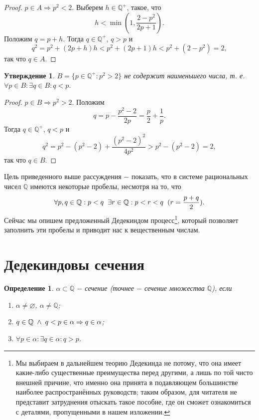 \documentclass{article}
\newtheorem{claim}{Утверждение}[section]
\newtheorem{definition}{Определение}[section]
\begin{document}
\begin{proof}
\(p \in A \Rightarrow p^2 < 2\). Выберем \(h \in \mathbb{Q^{+}}\), такое, что
\[
h < \min(1, \frac{2-p^2}{2p+1}).
\]
Положим \(q = p + h\). Тогда \(q \in \mathbb{Q^{+}}\), \(q > p\) и
\[
q^2 = p^2 + (2p + h)h < p^2 + (2p + 1)h < p^2 + (2 - p^2) = 2,
\]
так что \(q \in A\).
\end{proof}

\begin{claim}
\(B=\{p \in \mathbb{Q^{+}} : p^2 > 2\}\) не содержит наименьшего числа, т. е. \(\forall p \in B : \exists q \in B : q < p\).
\end{claim}

\begin{proof}
\(p \in B \Rightarrow p^2 > 2\). Положим
\[
q=p - \frac{p^2 - 2}{2p} = \frac{p}{2} + \frac{1}{p}.
\]
Тогда \(q \in \mathbb{Q^{+}}\), \(q < p\) и
\[
q^2 = p^2 - (p^2 - 2) + \frac{(p^2 - 2)^2}{4p^2} > p^2 - (p^2 - 2) = 2,
\]
так что \(q \in B\).
\end{proof}

Цель приведенного выше рассуждения \(-\) показать, что в системе рациональных чисел \(\mathbb{Q}\) имеются некоторые пробелы, несмотря на то, что 
\[
\forall p, q \in \mathbb{Q} : p < q \hspace{2mm} \exists r \in \mathbb{Q} : p < r < q \hspace{2mm} (r=\frac{p+q}{2}).
\]
Сейчас мы опишем предложенный Дедекиндом процесс\footnote[1]{Мы выбираем в дальнейшем теорию Дедекинда не потому, что она имеет какие-либо существенные преимущества перед другими, а лишь по той чисто внешней причине, что именно она принята в подавляющем большинстве наиболее распространённых руководств; таким образом, для читателя не представит затруднения отыскать такое пособие, где он сможет ознакомиться с деталями, пропущенными в нашем изложении.}, который позволяет заполнить эти пробелы и приводит нас к вещественным числам.

\section{Дедекиндовы сечения}

\begin{definition}
\(\alpha \subset \mathbb{Q}\) \(-\) сечение (точнее \(-\) сечение множества \(\mathbb{Q}\)), если
\renewcommand{\labelenumi}{\Roman{enumi}}
\begin{enumerate}
	\item \(\alpha \neq \varnothing\), \(\alpha \neq \mathbb{Q}\);
    \item \(q \in \mathbb{Q} \hspace{1mm} \land \hspace{1mm} q < p \in \alpha \Rightarrow q \in \alpha\);
    \item \(\forall p \in \alpha : \exists q \in \alpha : q > p\).
\end{enumerate}
\end{definition}
\end{document}
